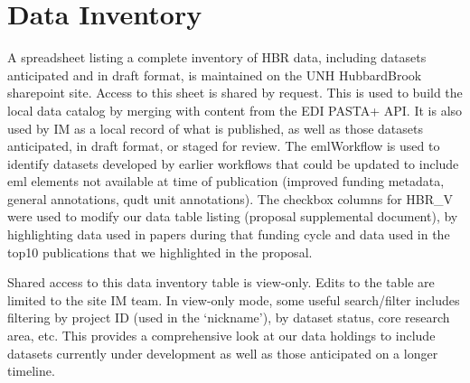 \documentclass[
  letterpaper,
  DIV=11,
  numbers=noendperiod]{scrreprt}
\begin{document}

\chapter{Data Inventory}\label{data-inventory}

A spreadsheet listing a complete inventory of HBR data, including
datasets anticipated and in draft format, is maintained on the UNH
HubbardBrook sharepoint site. Access to this sheet is shared by request.
This is used to build the local data catalog by merging with content
from the EDI PASTA+ API. It is also used by IM as a local record of what
is published, as well as those datasets anticipated, in draft format, or
staged for review. The emlWorkflow is used to identify datasets
developed by earlier workflows that could be updated to include eml
elements not available at time of publication (improved funding
metadata, general annotations, qudt unit annotations). The checkbox
columns for HBR\_V were used to modify our data table listing (proposal
supplemental document), by highlighting data used in papers during that
funding cycle and data used in the top10 publications that we
highlighted in the proposal.

Shared access to this data inventory table is view-only. Edits to the
table are limited to the site IM team. In view-only mode, some useful
search/filter includes filtering by project ID (used in the `nickname'),
by dataset status, core research area, etc. This provides a
comprehensive look at our data holdings to include datasets currently
under development as well as those anticipated on a longer timeline.
\end{document}
